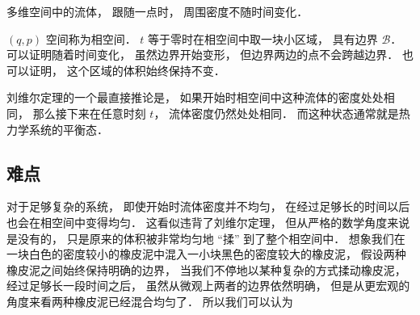
\begin{issues}
\issueDraft
\end{issues}

多维空间中的流体， 跟随一点时， 周围密度不随时间变化．

$(q, p)$ 空间称为相空间． $t$ 等于零时在相空间中取一块小区域， 具有边界 $\mathcal B$． 可以证明随着时间变化， 虽然边界开始变形， 但边界两边的点不会跨越边界． 也可以证明， 这个区域的体积始终保持不变．

刘维尔定理的一个最直接推论是， 如果开始时相空间中这种流体的密度处处相同， 那么接下来在任意时刻 $t$， 流体密度仍然处处相同． 而这种状态通常就是热力学系统的平衡态．

\subsection{难点}
对于足够复杂的系统， 即使开始时流体密度并不均匀， 在经过足够长的时间以后也会在相空间中变得均匀． 这看似违背了刘维尔定理， 但从严格的数学角度来说是没有的， 只是原来的体积被非常均匀地 “揉” 到了整个相空间中． 想象我们在一块白色的密度较小的橡皮泥中混入一小块黑色的密度较大的橡皮泥， 假设两种橡皮泥之间始终保持明确的边界， 当我们不停地以某种复杂的方式揉动橡皮泥， 经过足够长一段时间之后， 虽然从微观上两者的边界依然明确， 但是从更宏观的角度来看两种橡皮泥已经混合均匀了． 所以我们可以认为
